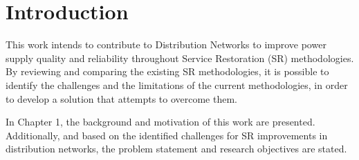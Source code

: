 \chapter{Introduction}
\label{ch-introduction}
This work intends to contribute to Distribution Networks to improve power supply quality 
and reliability throughout Service Restoration (SR) methodologies. By reviewing and comparing 
the existing SR methodologies, it is possible to identify the challenges and the limitations 
of the current methodologies, in order to develop a solution that attempts to overcome them.

In Chapter 1, the background and motivation of this work are presented. Additionally, and based on the 
identified challenges for SR improvements in distribution networks, the problem statement 
and research objectives are stated.  





